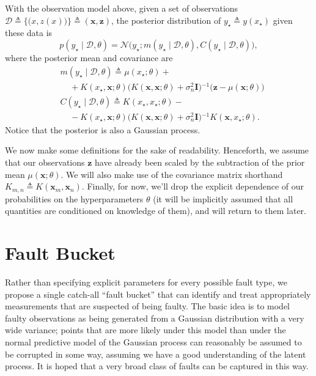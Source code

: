 \documentclass{article}
\newcommand{\deq}{\ensuremath{\triangleq}}
\newcommand{\given}{\ensuremath{\mid}}
\newcommand{\cm}[1]{\ensuremath{\mathcal{#1}}}
\newcommand{\bm}[1]{\ensuremath{\mathbf{#1}}}
\newcommand{\data}{\ensuremath{\cm{D}}}
\newcommand{\inv}{\ensuremath{^{-1}}}
\newcommand{\vect}[1]{\bm{#1}}
\newcommand{\vz}{\vect{z}}
\newcommand{\vx}{\vect{x}}
\newcommand{\mean}[2]{{m}(#1 \given #2 )}
\newcommand{\cov}[2]{{C}(#1 \given #2 )}
\newcommand{\st}{_{\star}}
\newcommand{\defequal}{\triangleq}
\begin{document}
With the observation model above, given a set of observations
$
 \data
 \deq
 \bigl\lbrace
   \bigl( x, z(x) \bigr)
 \bigr\rbrace
 \deq
 ( \bm{x}, \bm{z} )
$,
the posterior distribution of $y\st \deq y(x\st)$ given these data is
\begin{equation*}
 p(y\st \given \data, \theta)
 =
 \cm{N}
 \bigl(
   y\st;
   \mean{y\st}{\data,\theta},
   \cov{y\st}{\data,\theta}
 \bigr),
\end{equation*}
where the posterior mean and covariance are
\begin{align*}
 &
 \mean{y\st}{\data,\theta}
 \deq
 \mu(x\st; \theta)
 +
 {}
 \\
 &
 \mspace{20mu}
 +
 K(x\st, \bm{x}; \theta)
 \bigl(
 K(\bm{x}, \bm{x}; \theta) + \sigma_n^2 \bm{I}
 \bigr)\inv
 \bigl(
   \bm{z} - \mu(\bm{x}; \theta)
 \bigr)
 \\  
 &
 \cov{y\st}{\data,\theta}
 \deq
 K(x\st, x\st; \theta)
 -
 {}
 \\
 &
 \mspace{20mu}
 -
 K(x\st, \bm{x}; \theta)
 \bigl(
   K(\bm{x}, \bm{x}; \theta) + \sigma_n^2 \bm{I}
 \bigr)\inv
 K(\bm{x}, x\st; \theta).
\end{align*}
Notice that the posterior is also a Gaussian process. 

We now make some definitions for the sake of readability. Henceforth,
we assume that our observations $\vz$ have already been scaled by the
subtraction of the prior mean $\mu(\bm{x}; \theta)$. We will also make
use of the covariance matrix shorthand $K_{m,n} \defequal
K(\vx_m,\vx_n)$. Finally, for now, we'll drop the explicit dependence
of our probabilities on the hyperparameters $\theta$ (it will be
implicitly assumed that all quantities are conditioned on knowledge of
them), and will return to them later.

\section{Fault Bucket}\label{bucket}

Rather than specifying explicit parameters for every possible fault
type, we propose a single catch-all ``fault bucket'' that can identify
and treat appropriately measurements that are suspected of being
faulty.  The basic idea is to model faulty observations as being
generated from a Gaussian distribution with a very wide variance;
points that are more likely under this model than under the normal
predictive model of the Gaussian process can reasonably be assumed to
be corrupted in some way, assuming we have a good understanding of the
latent process. It is hoped that a very broad class of faults can be
captured in this way.
\end{document}
